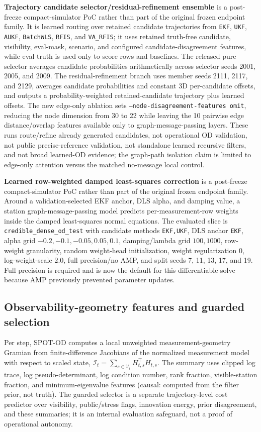 \documentclass{article}
\begin{document}
\textbf{Trajectory candidate selector/residual-refinement ensemble} is a post-freeze compact-simulator PoC rather than part of the original frozen endpoint family. It is learned routing over retained candidate trajectories from \texttt{EKF}, \texttt{UKF}, \texttt{AUKF}, \texttt{BatchWLS}, \texttt{RFIS}, and \texttt{VA\_RFIS}; it uses retained truth-free candidate, visibility, eval-mask, scenario, and configured candidate-disagreement features, while eval truth is used only to score rows and baselines. The released pure selector averages candidate probabilities arithmetically across selector seeds 2001, 2005, and 2009. The residual-refinement branch uses member seeds 2111, 2117, and 2129, averages candidate probabilities and constant 3D per-candidate offsets, and outputs a probability-weighted retained-candidate trajectory plus learned offsets. The new edge-only ablation sets \texttt{--node-disagreement-features omit}, reducing the node dimension from 30 to 22 while leaving the 10 pairwise edge distance/overlap features available only to graph-message-passing layers. These runs route/refine already generated candidates, not operational OD validation, not public precise-reference validation, not standalone learned recursive filters, and not broad learned-OD evidence; the graph-path isolation claim is limited to edge-only attention versus the matched no-message local control.

\textbf{Learned row-weighted damped least-squares correction} is a post-freeze compact-simulator PoC rather than part of the original frozen endpoint family. Around a validation-selected EKF anchor, DLS alpha, and damping value, a station graph-message-passing model predicts per-measurement-row weights inside the damped least-squares normal equations. The evaluated slice is \texttt{credible\_dense\_od\_test} with candidate methods \texttt{EKF,UKF}, DLS anchor \texttt{EKF}, alpha grid \(-0.2,-0.1,-0.05,0.05,0.1\), damping/lambda grid \(100,1000\), row-weight granularity, random weight-head initialization, weight regularization \(0\), log-weight-scale \(2.0\), full precision/no AMP, and split seeds 7, 11, 13, 17, and 19. Full precision is required and is now the default for this differentiable solve because AMP previously prevented parameter updates.

\subsection{Observability-geometry features and guarded selection}
Per step, SPOT-OD computes a local unweighted measurement-geometry Gramian from finite-difference Jacobians of the normalized measurement model with respect to scaled state, \(\mathcal{I}_t=\sum_{s\in\mathcal{V}_t}H_{t,s}^{\top}H_{t,s}\). The summary uses clipped log trace, log pseudo-determinant, log condition number, rank fraction, visible-station fraction, and minimum-eigenvalue features (causal: computed from the filter prior, not truth). The guarded selector is a separate trajectory-level cost predictor over visibility, public/stress flags, innovation energy, prior disagreement, and these summaries; it is an internal evaluation safeguard, not a proof of operational autonomy.
\end{document}
